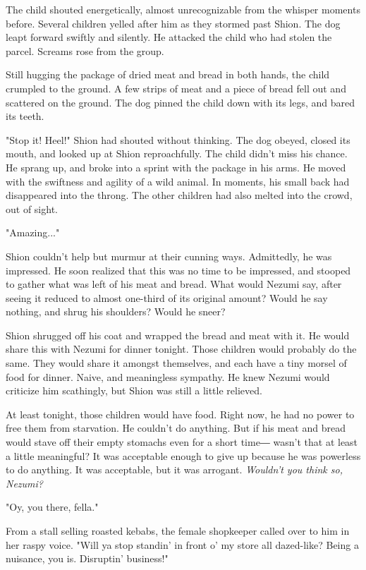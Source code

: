The child shouted energetically, almost unrecognizable from the whisper
moments before. Several children yelled after him as they stormed past
Shion. The dog leapt forward swiftly and silently. He attacked the child
who had stolen the parcel. Screams rose from the group.

Still hugging the package of dried meat and bread in both hands, the
child crumpled to the ground. A few strips of meat and a piece of bread
fell out and scattered on the ground. The dog pinned the child down with
its legs, and bared its teeth.

"Stop it! Heel!" Shion had shouted without thinking. The dog obeyed,
closed its mouth, and looked up at Shion reproachfully. The child didn't
miss his chance. He sprang up, and broke into a sprint with the package
in his arms. He moved with the swiftness and agility of a wild animal.
In moments, his small back had disappeared into the throng. The other
children had also melted into the crowd, out of sight.

"Amazing..."

Shion couldn't help but murmur at their cunning ways. Admittedly, he was
impressed. He soon realized that this was no time to be impressed, and
stooped to gather what was left of his meat and bread. What would Nezumi
say, after seeing it reduced to almost one-third of its original amount?
Would he say nothing, and shrug his shoulders? Would he sneer?

Shion shrugged off his coat and wrapped the bread and meat with it. He
would share this with Nezumi for dinner tonight. Those children would
probably do the same. They would share it amongst themselves, and each
have a tiny morsel of food for dinner. Naive, and meaningless sympathy.
He knew Nezumi would criticize him scathingly, but Shion was still a
little relieved.

At least tonight, those children would have food. Right now, he had no
power to free them from starvation. He couldn't do anything. But if his
meat and bread would stave off their empty stomachs even for a short
time― wasn't that at least a little meaningful? It was acceptable enough
to give up because he was powerless to do anything. It was acceptable,
but it was arrogant. \emph{Wouldn't you think so, Nezumi?}

"Oy, you there, fella."

From a stall selling roasted kebabs, the female shopkeeper called over
to him in her raspy voice. "Will ya stop standin' in front o' my store
all dazed-like? Being a nuisance, you is. Disruptin' business!"

